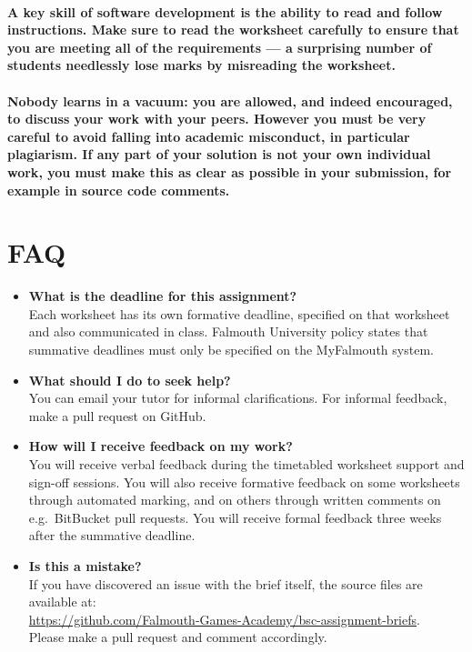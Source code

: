 \documentclass{../../fal_assignment}
\begin{document}
\paragraph{A key skill of software development is the ability to read and follow instructions.
Make sure to read the worksheet carefully to ensure that you are meeting all of the requirements ---
a surprising number of students needlessly lose marks by misreading the worksheet.}

\paragraph{Nobody learns in a vacuum: you are allowed, and indeed encouraged, to discuss your work with your peers. However you must be very careful to avoid falling into \textbf{academic misconduct}, in particular \textbf{plagiarism}. If any part of your solution is \textbf{not your own individual work}, you must make this as clear as possible in your submission, for example in source code comments.}

\section*{FAQ}

\begin{itemize}
	\item 	\textbf{What is the deadline for this assignment?} \\ 
			Each worksheet has its own formative deadline, specified on that worksheet and also communicated in class.
    		Falmouth University policy states that summative deadlines must only be specified on the MyFalmouth system.
    		
	\item 	\textbf{What should I do to seek help?} \\ 
    		You can email your tutor for informal clarifications. For informal feedback, make a pull request on GitHub. 
    		
	\item 	\textbf{How will I receive feedback on my work?} \\ 
			You will receive verbal feedback during the timetabled worksheet support and sign-off sessions.
			You will also receive formative feedback on some worksheets through automated marking,
			and on others through written comments on e.g.\ BitBucket pull requests.
			You will receive formal feedback three weeks after the summative deadline.
    		
    	\item 	\textbf{Is this a mistake?} \\ 	
    		If you have discovered an issue with the brief itself, the source files are available at: \\
    		\url{https://github.com/Falmouth-Games-Academy/bsc-assignment-briefs}.\\
    		 Please make a pull request and comment accordingly.
\end{itemize}
\end{document}

